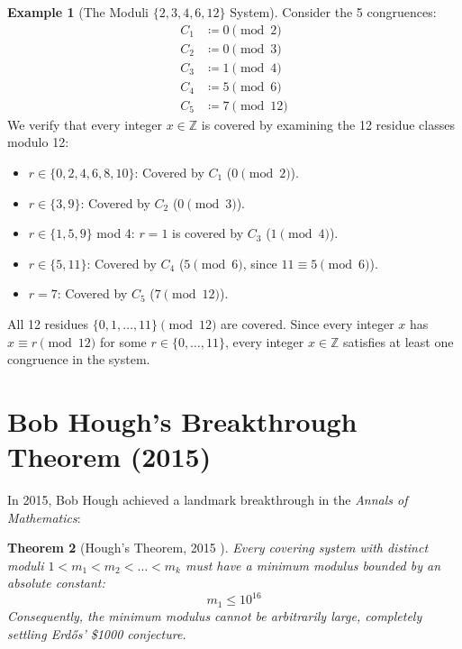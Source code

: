 \documentclass[11pt,a4paper]{article}
\newtheorem{theorem}{Theorem}[section]
\theoremstyle{definition}
\newtheorem{example}[theorem]{Example}
\begin{document}
\begin{example}[The Moduli $\{2, 3, 4, 6, 12\}$ System]\label{ex:canonical_covering}
Consider the 5 congruences:
\begin{align*}
C_1 &\coloneqq 0 \pmod 2 \\
C_2 &\coloneqq 0 \pmod 3 \\
C_3 &\coloneqq 1 \pmod 4 \\
C_4 &\coloneqq 5 \pmod 6 \\
C_5 &\coloneqq 7 \pmod{12}
\end{align*}
We verify that every integer $x \in \mathbb{Z}$ is covered by examining the 12 residue classes modulo 12:
\begin{itemize}
    \item $r \in \{0, 2, 4, 6, 8, 10\}$: Covered by $C_1$ ($0 \pmod 2$).
    \item $r \in \{3, 9\}$: Covered by $C_2$ ($0 \pmod 3$).
    \item $r \in \{1, 5, 9\}$ mod 4: $r = 1$ is covered by $C_3$ ($1 \pmod 4$).
    \item $r \in \{5, 11\}$: Covered by $C_4$ ($5 \pmod 6$, since $11 \equiv 5 \pmod 6$).
    \item $r = 7$: Covered by $C_5$ ($7 \pmod{12}$).
\end{itemize}
All 12 residues $\{0, 1, \dots, 11\} \pmod{12}$ are covered. Since every integer $x$ has $x \equiv r \pmod{12}$ for some $r \in \{0, \dots, 11\}$, every integer $x \in \mathbb{Z}$ satisfies at least one congruence in the system.
\end{example}

\section{Bob Hough's Breakthrough Theorem (2015)}

In 2015, Bob Hough \cite{hough2015} achieved a landmark breakthrough in the \emph{Annals of Mathematics}:

\begin{theorem}[Hough's Theorem, 2015 \cite{hough2015}]\label{thm:hough_main}
Every covering system with distinct moduli $1 < m_1 < m_2 < \dots < m_k$ must have a minimum modulus bounded by an absolute constant:
\begin{equation}\label{eq:hough_bound}
m_1 \le 10^{16}
\end{equation}
Consequently, the minimum modulus cannot be arbitrarily large, completely settling Erd\H{o}s' \$1000 conjecture.
\end{theorem}
\end{document}
